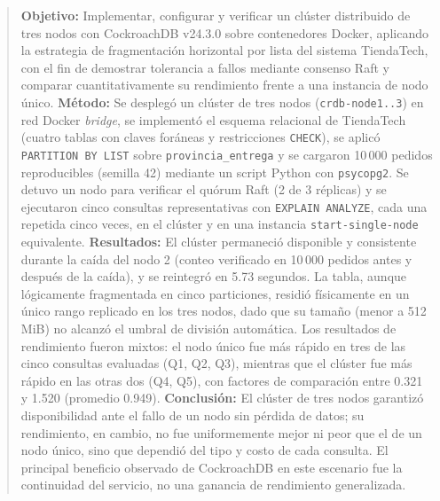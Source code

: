 \documentclass[10pt,letterpaper]{article}
\begin{document}
\begin{abstract}
\textbf{Objetivo:} Implementar, configurar y verificar un clúster distribuido de tres nodos con CockroachDB v24.3.0 sobre contenedores Docker, aplicando la estrategia de fragmentación horizontal por lista del sistema TiendaTech, con el fin de demostrar tolerancia a fallos mediante consenso Raft y comparar cuantitativamente su rendimiento frente a una instancia de nodo único.
\textbf{Método:} Se desplegó un clúster de tres nodos (\texttt{crdb-node1..3}) en red Docker \textit{bridge}, se implementó el esquema relacional de TiendaTech (cuatro tablas con claves foráneas y restricciones \texttt{CHECK}), se aplicó \texttt{PARTITION BY LIST} sobre \texttt{provincia\_entrega} y se cargaron 10\,000 pedidos reproducibles (semilla 42) mediante un script Python con \texttt{psycopg2}. Se detuvo un nodo para verificar el quórum Raft (2 de 3 réplicas) y se ejecutaron cinco consultas representativas con \texttt{EXPLAIN ANALYZE}, cada una repetida cinco veces, en el clúster y en una instancia \texttt{start-single-node} equivalente.
\textbf{Resultados:} El clúster permaneció disponible y consistente durante la caída del nodo 2 (conteo verificado en 10\,000 pedidos antes y después de la caída), y se reintegró en 5.73 segundos. La tabla, aunque lógicamente fragmentada en cinco particiones, residió físicamente en un único rango replicado en los tres nodos, dado que su tamaño (menor a 512 MiB) no alcanzó el umbral de división automática. Los resultados de rendimiento fueron mixtos: el nodo único fue más rápido en tres de las cinco consultas evaluadas (Q1, Q2, Q3), mientras que el clúster fue más rápido en las otras dos (Q4, Q5), con factores de comparación entre 0.321 y 1.520 (promedio 0.949).
\textbf{Conclusión:} El clúster de tres nodos garantizó disponibilidad ante el fallo de un nodo sin pérdida de datos; su rendimiento, en cambio, no fue uniformemente mejor ni peor que el de un nodo único, sino que dependió del tipo y costo de cada consulta. El principal beneficio observado de CockroachDB en este escenario fue la continuidad del servicio, no una ganancia de rendimiento generalizada.


\end{abstract}
\end{document}
